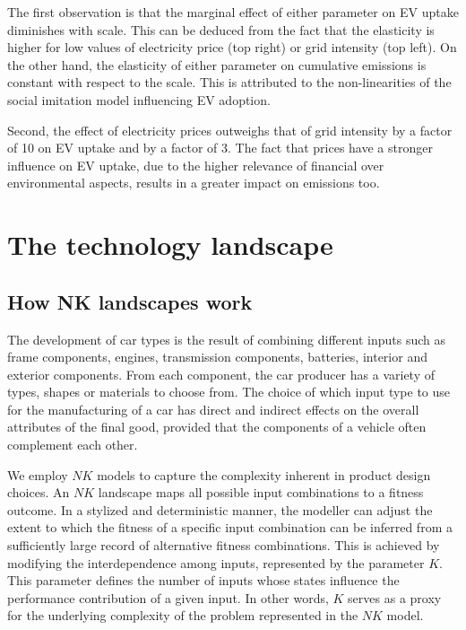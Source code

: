 \documentclass[12pt]{article}
\begin{document}
    The first observation is that the marginal effect of either parameter on EV uptake diminishes with scale. This can be deduced from the fact that the elasticity is higher for low values of electricity price (top right) or grid intensity (top left). On the other hand, the elasticity of either parameter on cumulative emissions is constant with respect to the scale. This is attributed to the non-linearities of the social imitation model influencing EV adoption. 
    
    Second, the effect of electricity prices outweighs that of grid intensity by a factor of 10 on EV uptake and by a factor of 3. The fact that prices have a stronger influence on EV uptake, due to the higher relevance of financial over environmental aspects, results in a greater impact on emissions too. 
        
	\section{The technology landscape} 
	\subsection{How NK landscapes work} \label{Appendix_NK}
	The development of car types is the result of combining different inputs such as frame components, engines, transmission components, batteries, interior and exterior components. From each component, the car producer has a variety of types, shapes or materials to choose from. The choice of which input type to use for the manufacturing of a car has direct and indirect effects on the overall attributes of the final good, provided that the components of a vehicle often complement each other.
	
	We employ $NK$ models \citep{kauffman1993origins, levinthal1997adaptation} to capture the complexity inherent in product design choices. An $NK$ landscape maps all possible input combinations to a fitness outcome. In a stylized and deterministic manner, the modeller can adjust the extent to which the fitness of a specific input combination can be inferred from a sufficiently large record of alternative fitness combinations. This is achieved by modifying the interdependence among inputs, represented by the parameter $K$. This parameter defines the number of inputs whose states influence the performance contribution of a given input. In other words, $K$ serves as a proxy for the underlying complexity of the problem represented in the $NK$ model.
	
\end{document}
